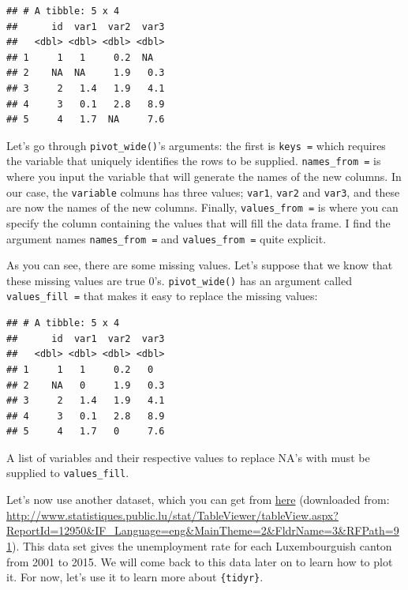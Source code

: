 \documentclass[]{gitbook}
\newenvironment{Shaded}{\begin{snugshade}}{\end{snugshade}}
\newcommand{\DataTypeTok}[1]{\textcolor[rgb]{0.13,0.29,0.53}{#1}}
\newcommand{\DecValTok}[1]{\textcolor[rgb]{0.00,0.00,0.81}{#1}}
\newcommand{\KeywordTok}[1]{\textcolor[rgb]{0.13,0.29,0.53}{\textbf{#1}}}
\newcommand{\NormalTok}[1]{#1}
\newcommand{\OperatorTok}[1]{\textcolor[rgb]{0.81,0.36,0.00}{\textbf{#1}}}
\newcommand{\StringTok}[1]{\textcolor[rgb]{0.31,0.60,0.02}{#1}}
\begin{document}
\begin{verbatim}
## # A tibble: 5 x 4
##      id  var1  var2  var3
##   <dbl> <dbl> <dbl> <dbl>
## 1     1   1     0.2  NA  
## 2    NA  NA     1.9   0.3
## 3     2   1.4   1.9   4.1
## 4     3   0.1   2.8   8.9
## 5     4   1.7  NA     7.6
\end{verbatim}

Let's go through \texttt{pivot\_wide()}'s arguments: the first is \texttt{keys\ =} which requires the variable
that uniquely identifies the rows to be supplied. \texttt{names\_from\ =} is where you input the variable that will
generate the names of the new columns. In our case, the \texttt{variable} colmuns has three values; \texttt{var1},
\texttt{var2} and \texttt{var3}, and these are now the names of the new columns. Finally, \texttt{values\_from\ =} is where
you can specify the column containing the values that will fill the data frame.
I find the argument names \texttt{names\_from\ =} and \texttt{values\_from\ =} quite explicit.

As you can see, there are some missing values. Let's suppose that we know that these missing values
are true 0's. \texttt{pivot\_wide()} has an argument called \texttt{values\_fill\ =} that makes it easy to replace
the missing values:

\begin{Shaded}
\end{Shaded}

\begin{verbatim}
## # A tibble: 5 x 4
##      id  var1  var2  var3
##   <dbl> <dbl> <dbl> <dbl>
## 1     1   1     0.2   0  
## 2    NA   0     1.9   0.3
## 3     2   1.4   1.9   4.1
## 4     3   0.1   2.8   8.9
## 5     4   1.7   0     7.6
\end{verbatim}

A list of variables and their respective values to replace NA's with must be supplied to \texttt{values\_fill}.

Let's now use another dataset, which you can get from
\href{https://github.com/b-rodrigues/modern_R/tree/master/datasets/unemployment/all}{here}
(downloaded from: \url{http://www.statistiques.public.lu/stat/TableViewer/tableView.aspx?ReportId=12950\&IF_Language=eng\&MainTheme=2\&FldrName=3\&RFPath=91}). This data set gives the unemployment rate for each Luxembourguish
canton from 2001 to 2015. We will come back to this data later on to learn how to plot it. For now,
let's use it to learn more about \texttt{\{tidyr\}}.
\end{document}
